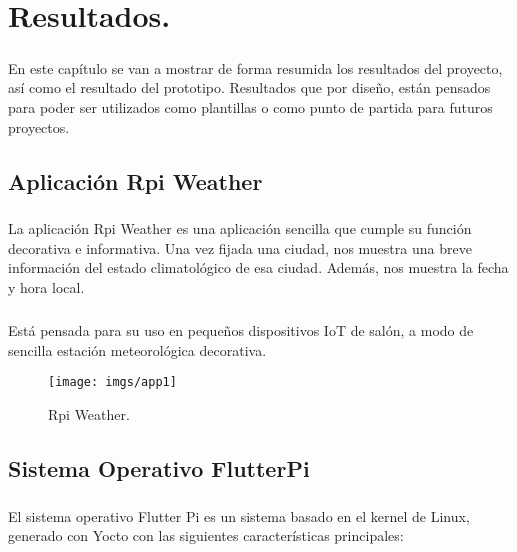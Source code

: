 \chapter{Resultados.}\label{sec:resultados}

\paragraph{}En este capítulo se van a mostrar de forma resumida los resultados del proyecto,
así como el resultado del prototipo. Resultados que por diseño, están pensados para
poder ser utilizados como plantillas o como punto de partida para futuros proyectos.

\section{Aplicación Rpi Weather}\label{sec:rpiweather}

\paragraph{}La aplicación Rpi Weather es una aplicación sencilla que cumple su función
decorativa e informativa. Una vez fijada una ciudad, nos muestra una breve información
del estado climatológico de esa ciudad. Además, nos muestra la fecha y hora local.

\paragraph{}Está pensada para su uso en pequeños dispositivos IoT de salón, a modo de
sencilla estación meteorológica decorativa.

\begin{figure}[H]
	\centering
	\texttt{[image: imgs/app1]}
	\caption[Rpi Weather]{Rpi Weather.}
	\label{img:rpi-weather-app}
\end{figure}

\section{Sistema Operativo FlutterPi}\label{sec:flutterpi}

\paragraph{}El sistema operativo Flutter Pi es un sistema basado en el kernel de Linux,
generado con Yocto con las siguientes características principales:

